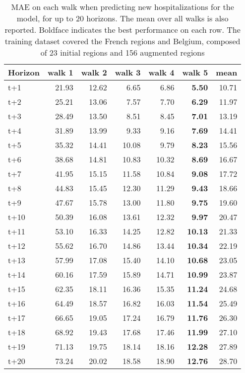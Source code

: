 \begin{table}[H]
\centering
\caption{MAE on each walk when predicting new hospitalizations for the model, for up to 20 horizons. The mean over all walks is also reported. Boldface indicates the best performance on each row. The training dataset covered the French regions and Belgium, composed of 23 initial regions and 156 augmented regions }
\label{tab:MAE_walk_custom_linear_regression}
\begin{tabular}{lrrrrrr}
\toprule
Horizon &  walk 1 &  walk 2 &  walk 3 &  walk 4 &  walk 5 &  mean \\
\midrule
t+1  & 21.93  & 12.62  & 6.65  & 6.86  & \textbf{5.50}  & 10.71  \\
t+2  & 25.21  & 13.06  & 7.57  & 7.70  & \textbf{6.29}  & 11.97  \\
t+3  & 28.49  & 13.50  & 8.51  & 8.45  & \textbf{7.01}  & 13.19  \\
t+4  & 31.89  & 13.99  & 9.33  & 9.16  & \textbf{7.69}  & 14.41  \\
t+5  & 35.32  & 14.41  & 10.08  & 9.79  & \textbf{8.23}  & 15.56  \\
t+6  & 38.68  & 14.81  & 10.83  & 10.32  & \textbf{8.69}  & 16.67  \\
t+7  & 41.95  & 15.15  & 11.58  & 10.84  & \textbf{9.08}  & 17.72  \\
t+8  & 44.83  & 15.45  & 12.30  & 11.29  & \textbf{9.43}  & 18.66  \\
t+9  & 47.67  & 15.78  & 13.00  & 11.80  & \textbf{9.75}  & 19.60  \\
t+10  & 50.39  & 16.08  & 13.61  & 12.32  & \textbf{9.97}  & 20.47  \\
t+11  & 53.10  & 16.33  & 14.25  & 12.82  & \textbf{10.13}  & 21.33  \\
t+12  & 55.62  & 16.70  & 14.86  & 13.44  & \textbf{10.34}  & 22.19  \\
t+13  & 57.99  & 17.08  & 15.40  & 14.10  & \textbf{10.68}  & 23.05  \\
t+14  & 60.16  & 17.59  & 15.89  & 14.71  & \textbf{10.99}  & 23.87  \\
t+15  & 62.35  & 18.11  & 16.36  & 15.35  & \textbf{11.24}  & 24.68  \\
t+16  & 64.49  & 18.57  & 16.82  & 16.03  & \textbf{11.54}  & 25.49  \\
t+17  & 66.65  & 19.05  & 17.24  & 16.79  & \textbf{11.76}  & 26.30  \\
t+18  & 68.92  & 19.43  & 17.68  & 17.46  & \textbf{11.99}  & 27.10  \\
t+19  & 71.13  & 19.75  & 18.14  & 18.16  & \textbf{12.28}  & 27.89  \\
t+20  & 73.24  & 20.02  & 18.58  & 18.90  & \textbf{12.76}  & 28.70  \\

\bottomrule
\end{tabular}
\end{table}
